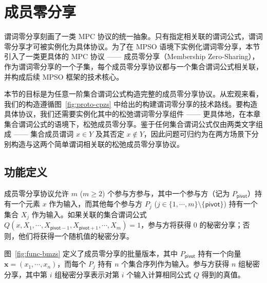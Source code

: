 \section{成员零分享}

谓词零分享刻画了一类 MPC 协议的统一抽象。只有指定相关联的谓词公式，谓词零分享才可被实例化为具体协议。为了在 MPSO 语境下实例化谓词零分享，本节引入了一类更具体的 MPC 协议 —— 成员零分享（Membership Zero-Sharing），作为谓词零分享的一个子集，每个成员零分享协议都与一个集合谓词公式相关联，并构成后续 MPSO 框架的技术核心。

本节的目标是为任意一阶集合谓词公式构造完整的成员零分享协议。从宏观来看，我们的构造遵循图~\ref{fig:proto-cpzs} 中给出的构建谓词零分享的技术路线。要构造具体协议，我们还需要实例化其中的松弛谓词零分享组件 —— 更具体地，在本章集合谓词公式的语境下，松弛成员零分享。鉴于任何集合谓词公式仅由两类文字组成 —— 集合成员谓词 $x \in Y$ 及其否定 $x \notin Y$，因此问题可归约为在两方场景下分别构造与这两个简单谓词相关联的松弛成员零分享协议。

\subsection{功能定义}\label{sec:mzs}

成员零分享协议允许 $m$ ($m \ge 2$) 个参与方参与，其中一个参与方（记为 $P_\mathsf{pivot}$）持有一个元素 $x$ 作为输入，而其他每个参与方 $P_j$ ($j \in \{1,\cdots,m\} \setminus \{\mathsf{pivot}\}$) 持有一个集合 $X_j$ 作为输入。如果关联的集合谓词公式 $Q(x,X_1,\cdots,X_{\mathsf{pivot}-1},X_{\mathsf{pivot}+1},\cdots, X_m) = 1$，参与方将获得 $0$ 的秘密分享；否则，他们将获得一个随机值的秘密分享。

图~\ref{fig:func-bmzs} 定义了成员零分享的批量版本，其中 $P_\mathsf{pivot}$ 持有一个向量 $\textbf{x} = (x_1, \cdots, x_n)$，而每个 $P_j$ 持有 $n$ 个集合序列作为输入。参与方获得 $n$ 组秘密分享，其中第 $i$ 组秘密分享表示对第 $i$ 个输入计算相同公式 $Q$ 得到的真值。

